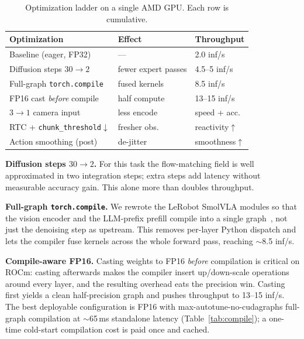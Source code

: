 \documentclass[blind]{gtac}
\begin{document}
\begin{table}[H]
\centering
\caption{Optimization ladder on a single AMD GPU. Each row is cumulative.}
\label{tab:ladder}
\footnotesize
\begin{tabular}{@{}p{1.55in}p{0.55in}p{0.55in}@{}}
\toprule
Optimization & Effect & Throughput \\
\midrule
Baseline (eager, FP32) & --- & 2.0 inf/s \\
Diffusion steps $30\!\to\!2$ & fewer expert passes & 4.5--5 inf/s \\
Full-graph \texttt{torch.compile} & fused kernels & 8.5 inf/s \\
FP16 cast \emph{before} compile & half compute & 13--15 inf/s \\
$3\!\to\!1$ camera input & less encode & speed + acc.\\
RTC + \texttt{chunk\_threshold}$\downarrow$ & fresher obs. & reactivity$\uparrow$ \\
Action smoothing (post) & de-jitter & smoothness$\uparrow$ \\
\bottomrule
\end{tabular}
\end{table}

\textbf{Diffusion steps $30\rightarrow2$.} For this task the flow-matching field
is well approximated in two integration steps; extra steps add latency without
measurable accuracy gain. This alone more than doubles throughput.

\textbf{Full-graph \texttt{torch.compile}.} We rewrote the LeRobot SmolVLA
modules so that the vision encoder and the LLM-prefix prefill compile into a
single graph~\cite{pytorch2}, not just the denoising step as
upstream. This removes per-layer Python dispatch and lets the compiler fuse
kernels across the whole forward pass, reaching $\sim$8.5 inf/s.

\textbf{Compile-aware FP16.} Casting weights to FP16 \emph{before} compilation is
critical on ROCm: casting afterwards makes the compiler insert up/down-scale
operations around every layer, and the resulting overhead eats the precision
win. Casting first yields a clean half-precision graph and pushes throughput to
13--15 inf/s. The best deployable configuration is FP16 with
max-autotune-no-cudagraphs full-graph compilation at $\sim$65\,ms standalone
latency (Table~\ref{tab:compile}); a one-time cold-start compilation cost is paid
once and cached.
\end{document}
